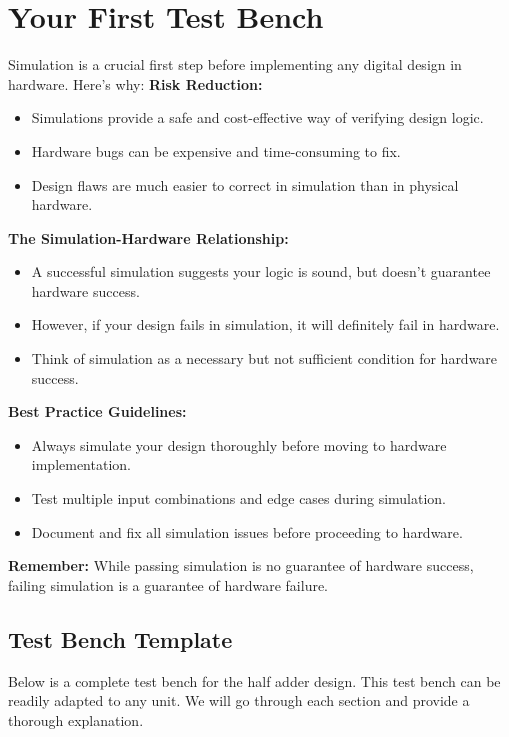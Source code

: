 \documentclass[12pt]{betterjournal}
\begin{document}
\section{Your First Test Bench}
Simulation is a crucial first step before implementing any digital design in hardware. Here's why:
\hfill\break
\hfill\break
\noindent\textbf{Risk Reduction:}
\noindent
\begin{itemize}
    \item Simulations provide a safe and cost-effective way of verifying design logic.
    \item Hardware bugs can be expensive and time-consuming to fix.
    \item Design flaws are much easier to correct in simulation than in physical hardware.
\end{itemize}
\hfill\break
\hfill\break
\noindent\textbf{The Simulation-Hardware Relationship:}
\noindent
\begin{itemize}
    \item A successful simulation suggests your logic is sound, but doesn't guarantee hardware success.
    \item However, if your design fails in simulation, it will definitely fail in hardware.
    \item Think of simulation as a necessary but not sufficient condition for hardware success.
\end{itemize}
\hfill\break
\hfill\break
\noindent
\textbf{Best Practice Guidelines:}
\noindent
\begin{itemize}
    \item Always simulate your design thoroughly before moving to hardware implementation.
    \item Test multiple input combinations and edge cases during simulation.
    \item Document and fix all simulation issues before proceeding to hardware.
\end{itemize}
\hfill\break
\hfill\break
\textbf{Remember:} While passing simulation is no guarantee of hardware success, failing simulation is a guarantee of hardware failure.

\subsection{Test Bench Template}
Below is a complete test bench for the half adder design. This test bench can be readily adapted to any unit. We will go through each section and provide a thorough explanation.
\end{document}
